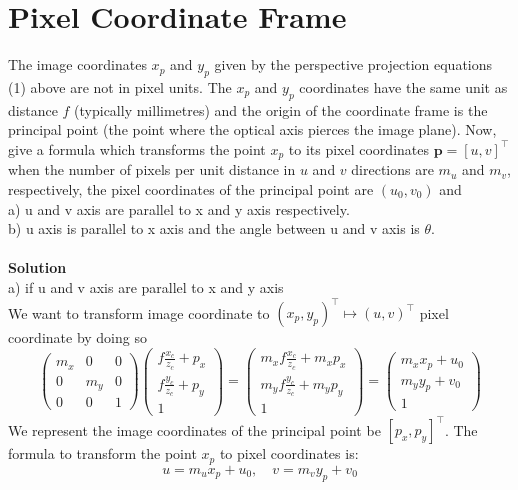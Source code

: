 \documentclass[a4paper,12pt]{article}
\begin{document}
\section{Pixel Coordinate Frame} 
The image coordinates $x_p$ and $y_p$ given by the perspective projection equations (1) above are not in pixel units. The $x_p$ and $y_p$ coordinates have the same unit as distance $f$ (typically millimetres) and the origin of the coordinate frame is the principal point (the point where the optical axis pierces the image plane). Now, give a formula which transforms the point $x_p$ to its pixel coordinates $\mathbf{p} = [u,v]^\intercal$ when the number of pixels per unit distance in $u$ and $v$ directions are $m_u$ and $m_v$, respectively, the pixel coordinates of the principal point are $(u_0,v_0)$ and \\ a) u and v axis are parallel to x and y axis respectively.
\\ b) u axis is parallel to x axis and the angle between u and v axis is $\theta$. \\\\
\textbf{Solution}\\
a) if u and v axis are parallel to x and y axis \\
We want to transform image coordinate to $(x_p, y_p)^\intercal \mapsto (u,v)^\intercal$ pixel coordinate by doing so
\[
\begin{pmatrix}
    m_x & 0 & 0 \\
    0 & m_y & 0 \\
    0 & 0 & 1
\end{pmatrix}
\begin{pmatrix}
    f\frac{x_c}{z_c} + p_x \\
    f\frac{y_c}{z_c} + p_y\\
    1
\end{pmatrix} = 
\begin{pmatrix}
    m_xf\frac{x_c}{z_c} + m_xp_x \\
    m_yf\frac{y_c}{z_c} + m_yp_y\\
    1
\end{pmatrix} =
\begin{pmatrix}
    m_xx_p + u_0 \\
    m_yy_p + v_0\\
    1
\end{pmatrix} 
\]
We represent the image coordinates of the principal point be $[p_x,p_y]^\intercal$. The formula to transform the point $x_p$ to pixel coordinates is:
$$u = m_ux_p + u_0, \quad v = m_vy_p + v_0$$\\
\end{document}
